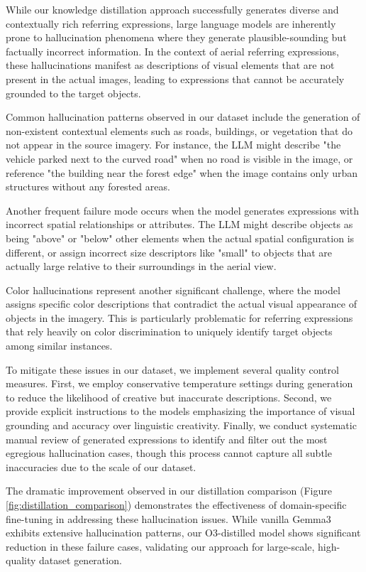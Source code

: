 While our knowledge distillation approach successfully generates diverse and contextually rich referring expressions, large language models are inherently prone to hallucination phenomena where they generate plausible-sounding but factually incorrect information. In the context of aerial referring expressions, these hallucinations manifest as descriptions of visual elements that are not present in the actual images, leading to expressions that cannot be accurately grounded to the target objects.

Common hallucination patterns observed in our dataset include the generation of non-existent contextual elements such as roads, buildings, or vegetation that do not appear in the source imagery. For instance, the LLM might describe "the vehicle parked next to the curved road" when no road is visible in the image, or reference "the building near the forest edge" when the image contains only urban structures without any forested areas.

Another frequent failure mode occurs when the model generates expressions with incorrect spatial relationships or attributes. The LLM might describe objects as being "above" or "below" other elements when the actual spatial configuration is different, or assign incorrect size descriptors like "small" to objects that are actually large relative to their surroundings in the aerial view.

Color hallucinations represent another significant challenge, where the model assigns specific color descriptions that contradict the actual visual appearance of objects in the imagery. This is particularly problematic for referring expressions that rely heavily on color discrimination to uniquely identify target objects among similar instances.

To mitigate these issues in our dataset, we implement several quality control measures. First, we employ conservative temperature settings during generation to reduce the likelihood of creative but inaccurate descriptions. Second, we provide explicit instructions to the models emphasizing the importance of visual grounding and accuracy over linguistic creativity. Finally, we conduct systematic manual review of generated expressions to identify and filter out the most egregious hallucination cases, though this process cannot capture all subtle inaccuracies due to the scale of our dataset.

The dramatic improvement observed in our distillation comparison (Figure \ref{fig:distillation_comparison}) demonstrates the effectiveness of domain-specific fine-tuning in addressing these hallucination issues. While vanilla Gemma3 exhibits extensive hallucination patterns, our O3-distilled model shows significant reduction in these failure cases, validating our approach for large-scale, high-quality dataset generation.

